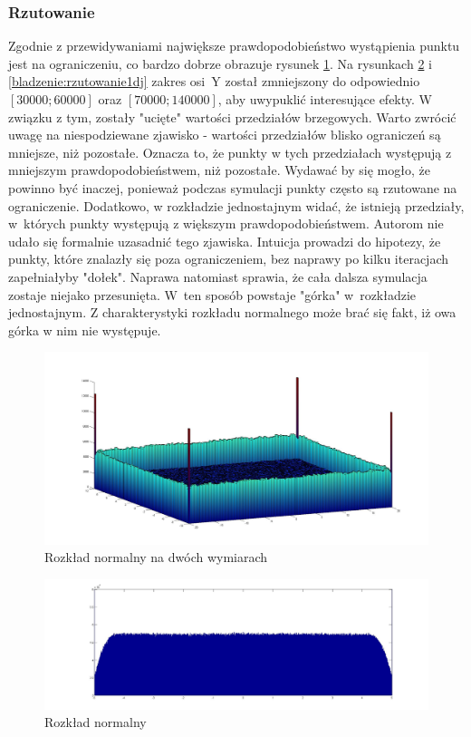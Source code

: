\documentclass{mini}
\begin{document}
\subsubsection*{Rzutowanie}
Zgodnie z przewidywaniami największe prawdopodobieństwo wystąpienia punktu jest na ograniczeniu, co bardzo dobrze obrazuje rysunek \ref{bladzenie:rzutowanie2d}. Na rysunkach \ref{bladzenie:rzutowanie1dn} i \ref{bladzenie:rzutowanie1dj} zakres osi~Y został zmniejszony do odpowiednio $[30000;60000]$ oraz $[70000;140000]$, aby uwypuklić interesujące efekty. W związku z tym, zostały "ucięte" wartości przedziałów brzegowych. Warto zwrócić uwagę na niespodziewane zjawisko - wartości przedziałów blisko ograniczeń są mniejsze, niż pozostałe. Oznacza to, że punkty w tych przedziałach występują z mniejszym prawdopodobieństwem, niż pozostałe. Wydawać by się mogło, że powinno być inaczej, ponieważ podczas symulacji punkty często są rzutowane na ograniczenie. Dodatkowo, w rozkładzie jednostajnym widać, że istnieją przedziały, w~których punkty występują z większym prawdopodobieństwem. Autorom nie udało się formalnie uzasadnić tego zjawiska. Intuicja prowadzi do hipotezy, że punkty, które znalazły się poza ograniczeniem, bez naprawy po kilku iteracjach zapełniałyby "dołek". Naprawa natomiast sprawia, że cała dalsza symulacja zostaje niejako przesunięta. W~ten sposób powstaje "górka" w~rozkładzie jednostajnym. Z charakterystyki rozkładu normalnego może brać się fakt, iż owa górka w nim nie występuje.

\begin{figure}[H]
\centering
\includegraphics[width=\textwidth]{p_n_10M_2__20_20__10_10_4_2}
\caption{Rozkład normalny na dwóch wymiarach}
\label{bladzenie:rzutowanie2d}
\end{figure}

\begin{figure}[H]
\centering
\includegraphics[width=\textwidth]{p_n_50M_1__5_5}
\caption{Rozkład normalny}
\label{bladzenie:rzutowanie1dn}
\end{figure}
\end{document}
